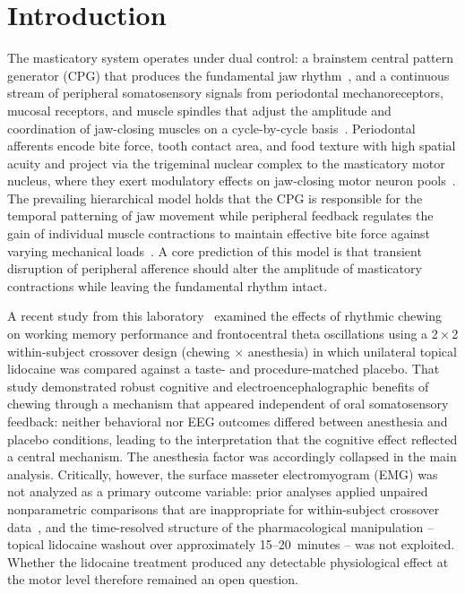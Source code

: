 ﻿\section*{Introduction}

The masticatory system operates under dual control: a brainstem central pattern
generator (CPG) that produces the fundamental jaw rhythm~\cite{Lund1991,Grillner2006},
and a continuous stream of peripheral somatosensory signals from periodontal
mechanoreceptors, mucosal receptors, and muscle spindles that adjust the
amplitude and coordination of jaw-closing muscles on a cycle-by-cycle
basis~\cite{Trulsson2006,Lobbezoo1997,Sessle2006}.
Periodontal afferents encode bite force, tooth contact area, and food texture
with high spatial acuity and project via the trigeminal nuclear complex to the
masticatory motor nucleus, where they exert modulatory effects on jaw-closing
motor neuron pools~\cite{Turker2002,Sessle2006}.
The prevailing hierarchical model holds that the CPG is responsible for the
temporal patterning of jaw movement while peripheral feedback regulates the
gain of individual muscle contractions to maintain effective bite force against
varying mechanical loads~\cite{Lund1991,Trulsson2006}.
A core prediction of this model is that transient disruption of peripheral
afference should alter the amplitude of masticatory contractions while
leaving the fundamental rhythm intact.

A recent study from this laboratory~\cite{espinoza2025} examined the effects
of rhythmic chewing on working memory performance and frontocentral theta
oscillations using a 2\,$\times$\,2 within-subject crossover design (chewing
$\times$ anesthesia) in which unilateral topical lidocaine was compared against
a taste- and procedure-matched placebo.
That study demonstrated robust cognitive and electroencephalographic benefits
of chewing through a mechanism that appeared independent of oral somatosensory
feedback: neither behavioral nor EEG outcomes differed between anesthesia and
placebo conditions, leading to the interpretation that the cognitive effect
reflected a central mechanism.
The anesthesia factor was accordingly collapsed in the main analysis.
Critically, however, the surface masseter electromyogram (EMG) was not
analyzed as a primary outcome variable: prior analyses applied unpaired
nonparametric comparisons that are inappropriate for within-subject crossover
data~\cite{Cohen1988}, and the time-resolved structure of the pharmacological
manipulation -- topical lidocaine washout over approximately 15--20~minutes --
was not exploited.
Whether the lidocaine treatment produced any detectable physiological effect at
the motor level therefore remained an open question.


